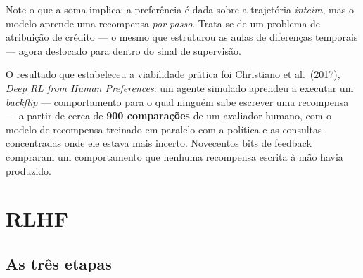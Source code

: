 \documentclass[11pt, a4paper]{article}
\newcommand{\thv}{\theta}
\newcommand{\polth}{\pol_{\thv}}
\newcommand{\pref}{\pol_{\mathrm{ref}}}
\newcommand{\psft}{\pol_{\mathrm{SFT}}}
\newcommand{\rphi}{r_{\phi}}
\newcommand{\yw}{y_{w}}
\newcommand{\yl}{y_{\ell}}
\begin{document}
\begin{ideiabox}
Note o que a soma implica: a preferência é dada sobre a trajetória \emph{inteira},
mas o modelo aprende uma recompensa \emph{por passo}. Trata-se de um problema de
atribuição de crédito --- o mesmo que estruturou as aulas de diferenças
temporais --- agora deslocado para dentro do sinal de supervisão.
\end{ideiabox}

O resultado que estabeleceu a viabilidade prática foi Christiano et al.\ (2017),
\emph{Deep RL from Human Preferences}: um agente simulado aprendeu a executar um
\emph{backflip} --- comportamento para o qual ninguém sabe escrever uma
recompensa --- a partir de cerca de \textbf{900 comparações} de um avaliador
humano, com o modelo de recompensa treinado em paralelo com a política e as
consultas concentradas onde ele estava mais incerto. Novecentos bits de feedback
compraram um comportamento que nenhuma recompensa escrita à mão havia produzido.

\section{RLHF}

\subsection{As três etapas}

\begin{center}
\end{center}
\end{document}
